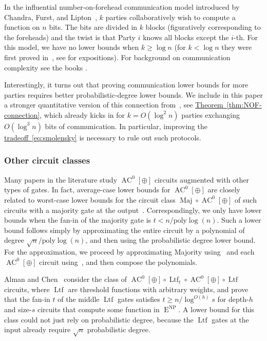\documentclass[11pt]{article}
\newcommand{\expref}[2]{\texorpdfstring{\hyperref[#2]{#1~\ref{#2}}}{#1~\ref{#2}}}
\newcommand{\expeqref}[2]{\texorpdfstring{\hyperref[#2]{#1~\eqref{#2}}}{#1~\eqref{#2}}}
\DeclareMathOperator{\Maj}{\mathrm{Maj}}  %
\DeclareMathOperator{\Ltf}{\mathrm{Ltf}}  %
\DeclareMathOperator{\AC}{\mathrm{AC}}  %
\DeclareMathOperator{\NP}{\mathrm{NP}}  %
\DeclareMathOperator{\EEE}{\mathrm{E}}  %
\newcommand{\poly}{\mathrm{poly}}
\begin{document}
In the influential number-on-forehead communication model introduced
by Chandra, Furst, and Lipton~\cite{CFL83}, $k$ parties collaboratively
wish to compute a function on $n$ bits. The bits are divided in $k$
blocks (figuratively corresponding to the foreheads) and the twist
is that Party $i$ knows all blocks except the %
$i$-th.   %
For this model,
we have no lower bounds when $k\ge\log n$ (for $k<\log n$ they were
first proved in~\cite{BNS92}, see \cite{ChT93,Raz00,ViW-GF2} for
expositions). %
%
%
%
%
%
For background on communication complexity see the books
\cite{KuN97,RaoY2019}.

Interestingly, it turns out that proving communication lower bounds
for more parties requires better probabilistic-degree lower bounds.
We include in this paper a stronger quantitative version of this connection
from~\cite{Viola-map}, see \expref{Theorem}{thm:NOF-connection}, which
already kicks in for $k=O(\log^{2}n)$ parties exchanging $O(\log^{3}n)$
bits of communication. In particular, improving the \expeqref{tradeoff}{eq:smolensky}
is necessary to rule out such protocols.

\subsubsection{Other circuit classes}

Many papers in the literature study $\AC^{0}[\oplus]$ circuits augmented
with other types of gates. In fact, average-case lower bounds for
$\AC^{0}[\oplus]$ are closely related to worst-case lower bounds for
the circuit class $\Maj\circ \AC^{0}[\oplus]$ of such circuits with
a majority gate at the output~\cite{HMPST93}. Correspondingly, we
only have lower bounds when the fan-in of the majority gate is $t<n/\poly\log(n)$.
Such a lower bound follows simply by approximating the entire circuit
by a polynomial of degree $\sqrt{n}/\poly\log(n)$, and then using
the probabilistic degree lower bound. For the approximation, we proceed
by approximating Majority using~\cite{DBLP:conf/focs/AlmanW15} and
each $\AC^{0}[\oplus]$ circuit using~\cite{Raz87}, and then compose
the polynomials.

Alman and Chen~\cite{AlmanC19} consider the class of 
$\AC^{0}[\oplus]\circ \Ltf_{t}\circ \AC^{0}[\oplus]\circ \Ltf$
circuits, where $\Ltf$ are threshold functions with arbitrary weights,
and prove that the fan-in $t$ of the middle $\Ltf$ gates satisfies
$t\ge n/\log^{O(h)}s$ for depth-$h$ and size-$s$ circuits that
compute some function in $\EEE^{\NP}$. A lower bound for this class could
not just rely on probabilistic degree, because the $\Ltf$ gates at the
input already require $\sqrt{n}$ probabilistic degree.
\end{document}
